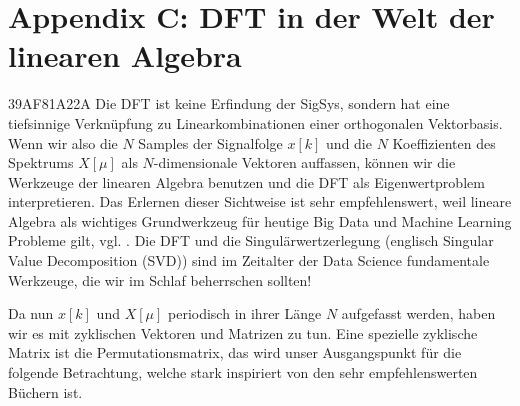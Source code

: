 \clearpage
\section{Appendix C: DFT in der Welt der linearen Algebra}
{\tiny 39AF81A22A}
%
\noindent Die DFT ist keine Erfindung der SigSys, sondern hat eine
tiefsinnige Verknüpfung zu Linearkombinationen einer orthogonalen
Vektorbasis.
%
Wenn wir also die $N$ Samples der Signalfolge $x[k]$ und die $N$ Koeffizienten des Spektrums $X[\mu]$
als $N$-dimensionale Vektoren auffassen, können wir die Werkzeuge der linearen
Algebra benutzen und die DFT als Eigenwertproblem interpretieren.
%
Das Erlernen dieser Sichtweise ist sehr empfehlenswert,
weil lineare Algebra als wichtiges Grundwerkzeug für heutige
Big Data und Machine Learning Probleme gilt, vgl. \cite{Strang2019}.
%
Die DFT und die Singulärwertzerlegung (englisch
Singular Value Decomposition (SVD)) sind im Zeitalter der Data Science
fundamentale Werkzeuge, die wir im Schlaf beherrschen sollten!
%

Da nun $x[k]$ und $X[\mu]$ periodisch in ihrer Länge $N$ aufgefasst werden,
haben wir es mit zyklischen Vektoren und Matrizen zu tun.
%
Eine spezielle zyklische Matrix ist die Permutationsmatrix, das wird unser
Ausgangspunkt für die folgende Betrachtung, welche stark inspiriert von
den sehr empfehlenswerten Büchern \cite{Strang2016, Strang2019} ist.
%

